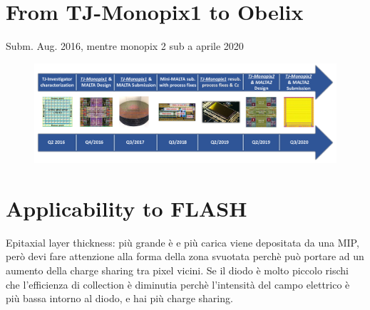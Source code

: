 \section{From TJ-Monopix1 to Obelix}
    Subm. Aug. 2016, mentre monopix 2 sub a aprile 2020\\

    \begin{figure}[h!]
        \centering
        \includegraphics[width=.7\linewidth]{figures/Monopix1/TJ180nm.png}
        \caption{}
        \label{fig:TJ180nm}
    \end{figure}

\section{Applicability to FLASH}
Epitaxial layer thickness: più grande è e più carica viene depositata da una MIP, però devi fare attenzione alla forma della zona svuotata perchè può portare ad un aumento della charge sharing tra pixel vicini. Se il diodo è molto piccolo rischi che l'efficienza di collection è diminutia perchè l'intensità del campo elettrico è più bassa intorno al diodo, e hai più charge sharing.\\